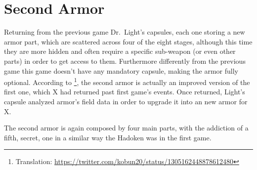 \section{Second Armor}\label{X2:Armor}
Returning from the previous game Dr.~Light's capsules, each one storing a new armor part, which are scattered across four of the eight stages, although this time they are more hidden and often require a specific sub-weapon (or even other parts) in order to get access to them. Furthermore differently from the previous game this game doesn't have any mandatory capsule, making the armor fully optional.
According to \cite{tw:second_armor}\footnote{Translation: \url{https://twitter.com/kobun20/status/1305162448878612480}}, the second armor is actually an improved version of the first one, which X had returned past first game's events. Once returned, Light's capsule analyzed armor's field data in order to upgrade it into an new armor for X.

The second armor is again composed by four main parts, with the addiction of a fifth, secret, one in a similar way the Hadoken was in the first game.

